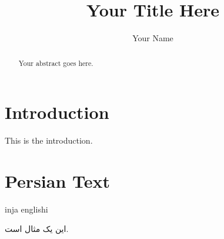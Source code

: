 \documentclass[runningheads]{llncs}
\begin{document}
\title{Your Title Here}
\author{Your Name}

\maketitle

\begin{abstract}
Your abstract goes here.
\end{abstract}

\section{Introduction}
This is the introduction.

\section{Persian Text}
inja englishi

\begin{farsi}
این یک مثال است.
\end{farsi}
\end{document}
